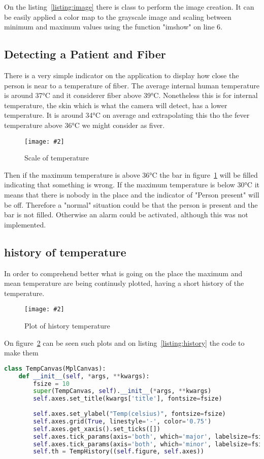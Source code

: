 \documentclass[hidelinks,11pt,a4paper,oneside,article]{memoir}
\newcommand{\putimage}[3][10] %
{
\begin{figure}[h]
    \centering
    \captionsetup{justification=centering}
    \texttt{[image: \#2]}
    \caption{#3}
    \label{fig:#2}
\end{figure}
}
\begin{document}
On the listing~\ref{listing:image} there is class to perform the image creation. It can be easily applied a color map to the grayscale image and scaling between minimum and maximum values using the function "imshow" on line 6.


\subsection*{Detecting a Patient and Fiber}
There is a very simple indicator on the application to display how close the person is near to a temperature of fiber. The average internal human temperature is around 37°C and it considerer fiber above 39°C. Nonetheless this is for internal temperature, the skin which is what the camera will detect, has a lower temperature. It is around 34°C on average and extrapolating this tho the fever temperature above 36°C we might consider as fiver.
    \putimage{fever}{Scale of temperature}
Then if the maximum temperature is above 36°C the bar in figure~\ref{fig:fever} will be filled indicating that something is wrong. If the maximum temperature is below 30°C it means that there is nobody in the place and the indicator of "Person present" will be off. Therefore a "normal" situation could be that the person is present and the bar is not filled. Otherwise an alarm could be activated, although this was not implemented.
\subsection*{history of temperature}
In order to comprehend better what is going on the place the maximum and mean temperature are being continusly plotted, having a short history of the temperature.
    \putimage{history}{Plot of history temperature}
On figure~\ref{fig:history} can be seen such plots and on listing~\ref{listing:history} the code to make them

\begin{lstlisting}[label={listing:history},caption={Class to plot the graphic of temperatures},language=Python, style=styleprogramming]
class TempCanvas(MplCanvas):
    def __init__(self, *args, **kwargs):
        fsize = 10
        super(TempCanvas, self).__init__(*args, **kwargs)
        self.axes.set_title(kwargs['title'], fontsize=fsize)
        
        self.axes.set_ylabel("Temp(celsius)", fontsize=fsize)
        self.axes.grid(True, linestyle='-', color='0.75')
        self.axes.get_xaxis().set_ticks([])
        self.axes.tick_params(axis='both', which='major', labelsize=fsize - 2)
        self.axes.tick_params(axis='both', which='minor', labelsize=fsize - 2)
        self.th = TempHistory((self.figure, self.axes))
\end{lstlisting}
\end{document}
